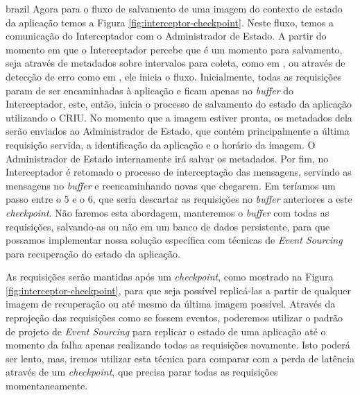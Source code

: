 \begin{otherlanguage*}{brazil}
Agora para o fluxo de salvamento de uma imagem do contexto de estado da aplicação temos a
Figura \ref{fig:interceptor-checkpoint}. Neste fluxo, temos a comunicação do Interceptador
com o Administrador de Estado. A partir do momento em que o Interceptador percebe que é um
momento para salvamento, seja através de metadados sobre intervalos para coleta, como em \cite{vayghan2021kubernetes}, ou através de detecção de erro como em \cite{tran2022proactive},
ele inicia o fluxo. Inicialmente, todas as requisições param de ser encaminhadas à aplicação
e ficam apenas no \textit{buffer} do Interceptador, este, então, inicia o processo de salvamento
do estado da aplicação utilizando o CRIU. No momento que a imagem estiver pronta, os metadados
dela serão enviados ao Administrador de Estado, que contém principalmente a última requisição
servida, a identificação da aplicação e o horário da imagem. O Administrador de Estado internamente
irá salvar os metadados. Por fim, no Interceptador é retomado o processo de interceptação das
mensagens, servindo as mensagens no \textit{buffer} e reencaminhando novas que chegarem. Em
\cite{muller2022architecture} teríamos um passo entre o 5 e o 6, que seria descartar as
requisições no \textit{buffer} anteriores a este \textit{checkpoint}. Não faremos esta abordagem,
manteremos o \textit{buffer} com todas as requisições, salvando-as ou não em um banco de dados
persistente, para que possamos implementar nossa solução específica com técnicas de
\textit{Event Sourcing} para recuperação do estado da aplicação.

As requisições serão mantidas após um \textit{checkpoint}, como mostrado na Figura
\ref{fig:interceptor-checkpoint}, para que seja possível replicá-las a partir de 
qualquer imagem de recuperação ou até mesmo da última imagem possível. Através da
reprojeção das requisições como se fossem eventos, poderemos utilizar o padrão de
projeto de \textit{Event Sourcing} \cite{event-sourcing} para replicar o estado de uma
aplicação até o momento da falha apenas realizando todas as requisições novamente.
Isto poderá ser lento, mas, iremos utilizar esta técnica para comparar com a perda
de latência através de um \textit{checkpoint}, que precisa parar todas as requisições
momentaneamente.


\end{otherlanguage*}
